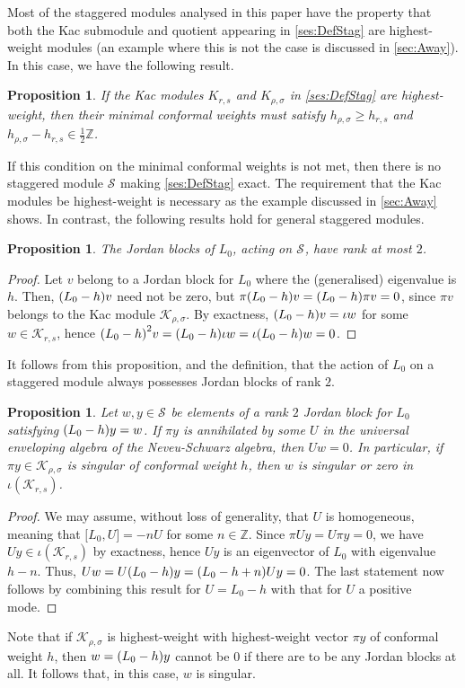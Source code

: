 \documentclass[a4paper,reqno,12pt]{report}
\theoremstyle{definition}
\numberwithin{equation}{section}
\let\originalleft\left     %
\let\originalright\right
\renewcommand{\left}{\mathopen{}\mathclose\bgroup\originalleft}
\renewcommand{\right}{\aftergroup\egroup\originalright}
\newcommand{\brac}[1]{\left( #1 \right)}
\newcommand{\ZZ}{\mathbb{Z}}
\newcommand{\comm}[2]{\bigl[ #1 , #2 \bigr]}
\newcommand{\Kac}[1]{\mathcal{K}_{#1}}       %
\newcommand{\Stag}[2]{\mathcal{S}_{#1}^{#2}} %
\newcommand{\uea}{universal enveloping algebra}
\newcommand{\hw}{highest-weight}
\newcommand{\hws}{\hw{} vector}
\newcommand{\hwms}{\hw{} modules}
\newcommand{\ns}{Neveu-Schwarz}
\renewcommand{\ge}{\geqslant}
\theoremstyle{plain}
\newtheorem{prop}[thm]{Proposition}
\begin{document}
Most of the staggered modules analysed in this paper have the property that both the Kac submodule and quotient appearing in \eqref{ses:DefStag} are \hwms{} (an example where this is not the case is discussed in \cref{sec:Away}).  In this case, we have the following result.
%
\begin{prop}
If the Kac modules $K_{r,s}$ and $K_{\rho,\sigma}$ in \eqref{ses:DefStag} are \hw{}, then their minimal conformal weights must satisfy $h_{\rho,\sigma} \ge h_{r,s}$ and $h_{\rho,\sigma} - h_{r,s} \in \frac{1}{2} \ZZ$.
\end{prop}
%
If this condition on the minimal conformal weights is not met, then there is no staggered module $\Stag{}{}$ making \eqref{ses:DefStag} exact.  The requirement that the Kac modules be \hw{} is necessary as the example discussed in \cref{sec:Away} shows.  In contrast, the following results hold for general staggered modules.
%
\begin{prop}
The Jordan blocks of $L_0$, acting on $\Stag{}{}$, have rank at most $2$.
\end{prop}
\begin{proof}
Let $v$ belong to a Jordan block for $L_0$ where the (generalised) eigenvalue is $h$.  Then, $\brac{L_0 - h} v$ need not be zero, but $\pi \brac{L_0 - h} v = \brac{L_0 - h} \pi v = 0$, since $\pi v$ belongs to the Kac module $\Kac{\rho,\sigma}$.  By exactness, $\brac{L_0 - h} v = \iota w$ for some $w \in \Kac{r,s}$, hence $\brac{L_0 - h}^2 v = \brac{L_0 - h} \iota w = \iota \brac{L_0 - h} w = 0$.
\end{proof}
%
It follows from this proposition, and the definition, that the action of $L_0$ on a staggered module always possesses Jordan blocks of rank $2$.
%
\begin{prop} \label{prop:StagAnn}
Let $w,y \in \Stag{}{}$ be elements of a rank $2$ Jordan block for $L_0$ satisfying $\brac{L_0 - h} y = w$.  If $\pi y$ is annihilated by some $U$ in the \uea{} of the \ns{} algebra, then $Uw = 0$.  In particular, if $\pi y \in \Kac{\rho,\sigma}$ is singular of conformal weight $h$, then $w$ is singular or zero in $\iota (\Kac{r,s})$.
\end{prop}
\begin{proof}
We may assume, without loss of generality, that $U$ is homogeneous, meaning that $\comm{L_0}{U} = -n U$ for some $n \in \ZZ$.  Since $\pi U y = U \pi y = 0$, we have $Uy \in \iota (\Kac{r,s})$ by exactness, hence $Uy$ is an eigenvector of $L_0$ with eigenvalue $h-n$.  Thus, $Uw = U \brac{L_0 - h} y = \brac{L_0 - h + n} Uy = 0$.  The last statement now follows by combining this result for $U = L_0 - h$ with that for $U$ a positive mode.
\end{proof}
%
Note that if $\Kac{\rho,\sigma}$ is \hw{} with \hws{} $\pi y$ of conformal weight $h$, then $w = \brac{L_0 - h} y$ cannot be $0$ if there are to be any Jordan blocks at all.  It follows that, in this case, $w$ is singular.
\end{document}
